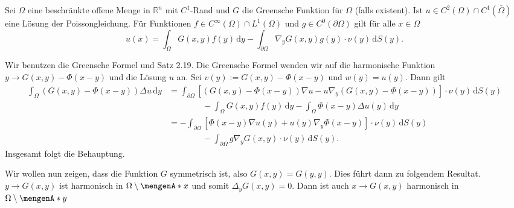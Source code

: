 \begin{satz}
	Sei $\Omega$ eine beschränkte offene Menge in $\mathbb{R}^n$ mit $C^1$-Rand und $G$ die Greensche Funktion für $\Omega$ (falls existent). 
	Ist $u \in C^2(\Omega) \cap C^1(\bar{\Omega})$ eine Lösung der Poissongleichung. 
	Für Funktionen $f \in C^{\infty}(\Omega) \cap L^1(\Omega)$ und $g \in C^0(\partial \Omega)$ gilt für alle $x \in \Omega$
	\[
		u(x) = \int_{\Omega}^{} G(x,y)f(y) \,\mathrm{d}y - \int_{\partial \Omega}^{}  \nabla_y G(x,y) g(y) \cdot \nu(y) \,\mathrm{d}S(y).
	\]
\end{satz}
\begin{beweis}
	Wir benutzen die Greensche Formel und Satz 2.19. Die Greensche Formel wenden wir auf die harmonische Funktion $y \to G(x,y) - \Phi(x-y)$ und die Lösung $u$ an. 
	Sei $v(y):= G(x,y) - \Phi(x-y)$ und $w(y)= u(y)$. Dann gilt
	\begin{align*}
		\int_{\Omega}^{}(G(x,y)-\Phi(x-y)) \Delta u \,\mathrm{d}y 
		&= \int_{\partial \Omega}^{} \left[ (G(x,y)- \Phi(x-y))  \nabla u - u  \nabla_y (G(x,y)-\Phi(x-y)) \right] \cdot \nu(y)  \,\mathrm{d}S(y) \\
		& \qquad \qquad - \int_{\Omega}^{} G(x,y)f(y) \,\mathrm{d}y - \int_{\Omega}^{} \Phi(x-y) \Delta u(y) \,\mathrm{d}y  \\
		& = - \int_{\partial \Omega}^{} \left[ \Phi(x-y)  \nabla u(y) + u(y)  \nabla_y \Phi(x-y) \right] \cdot \nu(y)  \,\mathrm{d}S(y) \\
		& \qquad \qquad -\int_{\partial \Omega}^{} g  \nabla_y G(x,y) \cdot \nu(y)  \,\mathrm{d}S(y).		
	\end{align*}
	Insgesamt folgt die Behauptung.
\end{beweis}
Wir wollen nun zeigen, dass die Funktion $G$ symmetrisch ist, also $G(x,y)=G(y,y)$. Dies führt dann zu folgendem Resultat.
$y \to G(x,y)$ ist harmonisch in $\Omega \setminus \set{x}$ und somit $ \Delta_y G(x,y)=0$. Dann ist auch $x \to G(x,y)$ harmonisch in $\Omega \setminus \set{y}$

